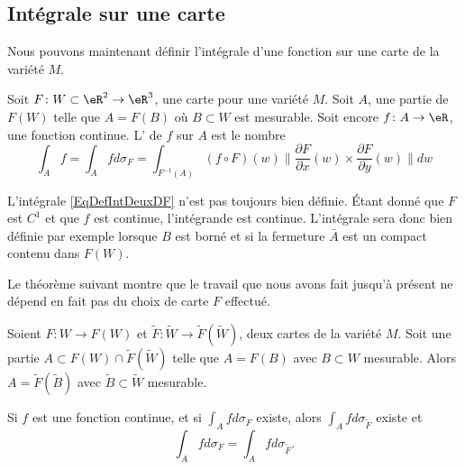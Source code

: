 \subsection{Intégrale sur une carte}

Nous pouvons maintenant définir l'intégrale d'une fonction sur une carte de la variété \( M\).
\begin{definition}      \label{DEFooZNFOooZPiBWY}
	Soit \( F\colon W\subset \eR^2\to \eR^3\), une carte pour une variété \( M\). Soit \( A\), une partie de \( F(W)\) telle que \( A=F(B)\) où \( B\subset W\) est mesurable.  Soit encore \( f\colon A\to \eR\), une fonction continue. L' de \( f\) sur \( A\) est le nombre
	\begin{equation}	\label{EqDefIntDeuxDF}
		\int_Af=\int_Afd\sigma_F=\int_{F^{-1}(A)}(f\circ F)(w)\|  \frac{ \partial F }{ \partial x }(w)\times\frac{ \partial F }{ \partial y }(w) \| dw
	\end{equation}
\end{definition}

\begin{remark}
	L'intégrale \eqref{EqDefIntDeuxDF} n'est pas toujours bien définie. Étant donné que \( F\) est \( C^1\) et que \( f\) est continue, l'intégrande est continue. L'intégrale sera donc bien définie par exemple lorsque \( B\) est borné et si la fermeture \( \bar A\) est un compact contenu dans \( F(W)\).
\end{remark}

Le théorème suivant montre que le travail que nous avons fait jusqu'à présent ne dépend en fait pas du choix de carte \( F\) effectué.

\begin{theorem}\label{ThoIntIndepF}
	Soient \( F\colon W\to F(W)\) et \( \tilde F\colon \tilde W\to \tilde F(\tilde W)\), deux cartes de la variété \( M\). Soit une partie \( A\subset F(W)\cap\tilde F(\tilde W)\) telle que \( A=F(B)\) avec \( B\subset W\) mesurable.  Alors \( A=\tilde F(\tilde B)\) avec \( \tilde B\subset\tilde W\) mesurable.

	Si \( f\) est une fonction continue, et si \( \int_Afd\sigma_F\) existe, alors \( \int_Afd\sigma_{\tilde F}\) existe et
	\begin{equation}
		\int_Afd\sigma_F=\int_Afd\sigma_{\tilde F}.
	\end{equation}
\end{theorem}


